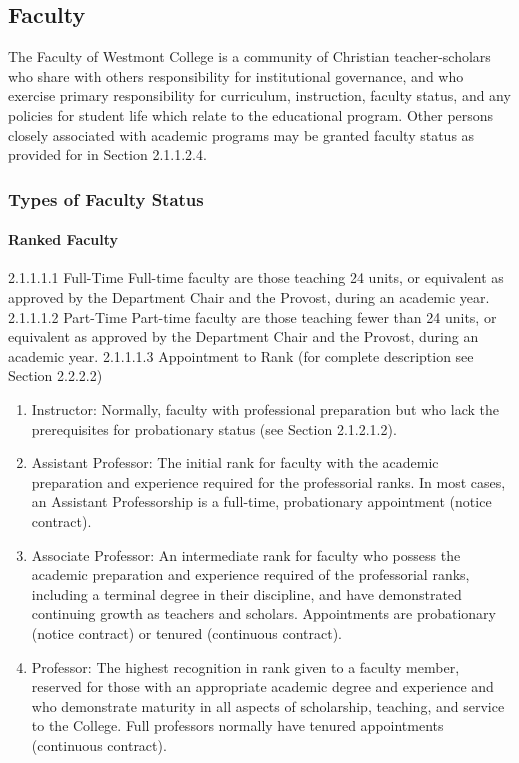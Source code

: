 \documentclass[letterpaper, 11pt]{article}
\begin{document}
	\subsection{Faculty}
		The Faculty of Westmont College is a community of Christian teacher-scholars who share with others responsibility for institutional governance, and who exercise primary responsibility for curriculum, instruction, faculty status, and any policies for student life which relate to the educational program.  Other persons closely associated with academic programs may be granted faculty status as provided for in Section 2.1.1.2.4.
		\subsubsection{Types of Faculty Status}
			\paragraph{Ranked Faculty}
				2.1.1.1.1 Full-Time
				Full-time faculty are those teaching 24 units, or equivalent as approved by the Department Chair and the Provost, during an academic year.
				2.1.1.1.2 Part-Time
				Part-time faculty are those teaching fewer than 24 units, or equivalent as approved by the Department Chair and the Provost, during an academic year.
				2.1.1.1.3 Appointment to Rank
				(for complete description see Section 2.2.2.2)
				\begin{enumerate}[label=\alph*)]
					\item{Instructor:  Normally, faculty with professional preparation but who lack the prerequisites for probationary status (see Section 2.1.2.1.2).}
					\item{Assistant Professor:  The initial rank for faculty with the academic preparation and experience required for the professorial ranks. In most cases, an Assistant Professorship is a full-time, probationary appointment (notice contract).}
					\item{Associate Professor:  An intermediate rank for faculty who possess the academic preparation and experience required of the professorial ranks, including a terminal degree in their discipline, and have demonstrated continuing growth as teachers and scholars. Appointments are probationary (notice contract) or tenured (continuous contract).}
					\item{Professor:  The highest recognition in rank given to a faculty member, reserved for those with an appropriate academic degree and experience and who demonstrate maturity in all aspects of scholarship, teaching, and service to the College. Full professors normally have tenured appointments (continuous contract).}
				\end{enumerate}
\end{document}
